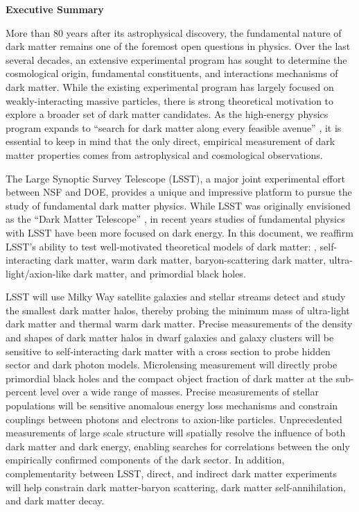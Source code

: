 \begin{center}
  {\Large \bf Executive Summary}
\end{center}

More than 80 years after its astrophysical discovery, the fundamental nature of dark matter remains one of the foremost open questions in physics.
Over the last several decades, an extensive experimental program has sought to determine the cosmological origin, fundamental constituents, and interactions mechanisms of dark matter. 
While the existing experimental program has largely focused on weakly-interacting massive particles, there is strong theoretical motivation to explore a broader set of dark matter candidates.
As the high-energy physics program expands to ``search for dark matter along every feasible avenue'' \citep{P5:2014}, it is essential to keep in mind that the only direct, empirical measurement of dark matter properties comes from astrophysical and cosmological observations.

The Large Synoptic Survey Telescope (LSST), a major joint experimental effort between NSF and DOE, provides a unique and impressive platform to pursue the study of fundamental dark matter physics.
While LSST was originally envisioned as the ``Dark Matter Telescope'' \citep{Tyson:2001}, in recent years studies of fundamental physics with LSST have been more focused on dark energy.
In this document, we reaffirm LSST's ability to test well-motivated theoretical models of dark matter: \ie, self-interacting dark matter, warm dark matter, baryon-scattering dark matter, ultra-light/axion-like dark matter, and primordial black holes. 

LSST will use Milky Way satellite galaxies and stellar streams detect and study the smallest dark matter halos, thereby probing the minimum mass of ultra-light dark matter and thermal warm dark matter.
Precise measurements of the density and shapes of dark matter halos in dwarf galaxies and galaxy clusters will be sensitive to self-interacting dark matter with a cross section to probe hidden sector and dark photon models.
Microlensing measurement will directly probe primordial black holes and the compact object fraction of dark matter at the sub-percent level over a wide range of masses.
Precise measurements of stellar populations will be sensitive anomalous energy loss mechanisms and constrain couplings between photons and electrons to axion-like particles.
Unprecedented measurements of large scale structure will spatially resolve the influence of both dark matter and dark energy, enabling searches for correlations between the only empirically confirmed components of the dark sector.
In addition, complementarity between LSST, direct, and indirect dark matter experiments will help constrain dark matter-baryon scattering, dark matter self-annihilation, and dark matter decay.

